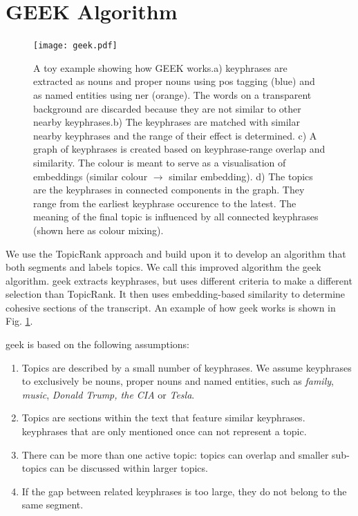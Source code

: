 \section{GEEK Algorithm}

    \begin{figure}
        \centering
        \texttt{[image: geek.pdf]}
        \caption{A toy example showing how GEEK works.\newline a) \Glspl{keyphrase} are extracted as nouns and proper nouns using \gls{pos} tagging (blue) and as named entities using \gls{ner} (orange). The words on a transparent background are discarded because they are not similar to other nearby \glspl{keyphrase}.\newline b) The \glspl{keyphrase} are matched with similar nearby \glspl{keyphrase} and the range of their effect is determined. \newline c) A graph of \glspl{keyphrase} is created based on \gls{keyphrase}-range overlap and similarity. The colour is meant to serve as a visualisation of embeddings (similar colour $\rightarrow$ similar embedding).\newline
        d) The topics are the \glspl{keyphrase} in connected components in the graph. They range from the earliest \gls{keyphrase} occurence to the latest. The meaning of the final topic is influenced by all connected \glspl{keyphrase} (shown here as colour mixing).
        }
        \label{fig:geek architecture}
    \end{figure}

We use the TopicRank approach and build upon it to develop an algorithm that both segments and labels topics. We call this improved algorithm the \gls{geek} algorithm. \gls{geek} extracts \glspl{keyphrase}, but uses different criteria to make a different selection than TopicRank.
It then uses \gls{embedding}-based similarity to determine cohesive sections of the transcript. An example of how \gls{geek} works is shown in Fig. \ref{fig:geek architecture}.

\gls{geek} is based on the following assumptions:

\begin{enumerate}
    \item Topics are described by a small number of \glspl{keyphrase}. We assume \glspl{keyphrase} to exclusively be nouns, proper nouns and named entities, such as \textit{family}, \textit{music}, \textit{Donald Trump, the CIA} or \textit{Tesla}.
    \item Topics are sections within the text that feature similar \glspl{keyphrase}. \glspl{keyphrase} that are only mentioned once can not represent a topic.
    \item There can be more than one active topic: topics can overlap and smaller sub-topics can be discussed within larger topics.
    \item If the gap between related \glspl{keyphrase} is too large, they do not belong to the same segment.
\end{enumerate}
    
